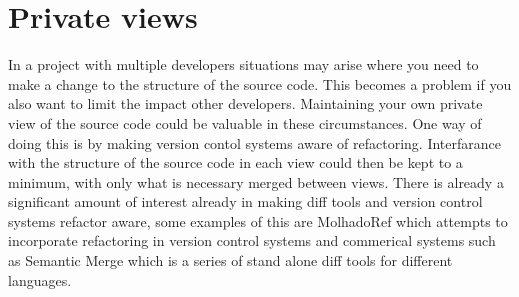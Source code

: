
\chapter{Private views}

In a project with multiple developers situations may arise where you need to make a change to the structure of the source code. This becomes a problem if you also want to limit the impact other developers.  Maintaining your own private view of the source code could be valuable in these circumstances. One way of doing this is by making version contol systems aware of refactoring.  Interfarance with the structure of the source code in each view could then be kept to a minimum, with only what is necessary merged between views. There is already a significant amount of interest already in making diff tools and version control systems refactor aware, some examples of this are MolhadoRef \cite{DannyDig} \cite{Dig2008} which attempts to incorporate refactoring in version control systems and commerical systems such as Semantic Merge which is a series of stand alone diff tools for different languages. 

